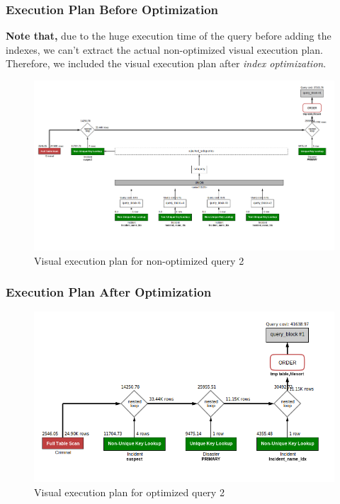 \subsubsection{Execution Plan Before Optimization}
\textbf{Note that,} due to the huge execution time of the query before adding the indexes, we can't extract the actual non-optimized visual execution plan. Therefore, we included the visual execution plan after \emph{index optimization}. 
\begin{figure}[H]
    \centering
    \includegraphics[width=\textwidth]{images/execution_plans/q2-2-new.png}
    \caption{Visual execution plan for non-optimized query 2}
\end{figure}

\subsubsection{Execution Plan After Optimization}
\begin{figure}[H]
    \centering
    \includegraphics[width=\textwidth]{images/execution_plans/q2-4-new.png}
    \caption{Visual execution plan for optimized query 2}
\end{figure}

